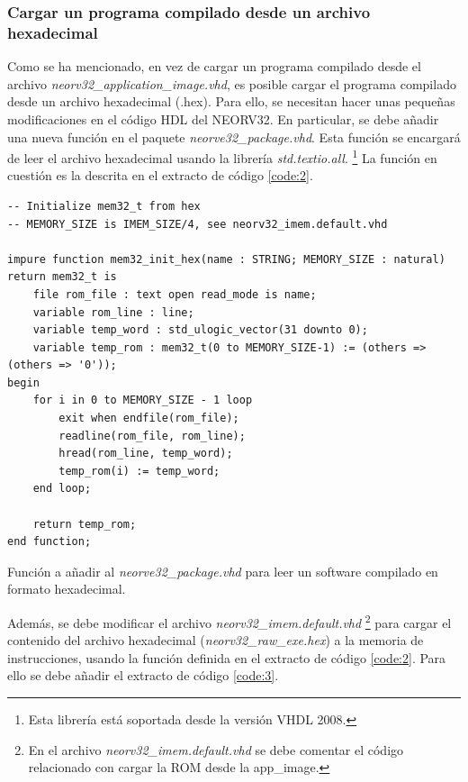 \subsubsection{Cargar un programa compilado desde un archivo hexadecimal}

Como se ha mencionado, en vez de cargar un programa compilado desde el archivo \textit{neorv32\_application\_image.vhd}, es posible cargar el programa compilado desde un archivo hexadecimal (.hex).
Para ello, se necesitan hacer unas pequeñas modificaciones en el código HDL del NEORV32.
En particular, se debe añadir una nueva función en el paquete \textit{neorve32\_package.vhd}.
Esta función se encargará de leer el archivo hexadecimal usando la librería \textit{std.textio.all}. \footnote{Esta librería está soportada desde la versión VHDL 2008.}
La función en cuestión es la descrita en el extracto de código \ref{code:2}.

\begin{code}
\begin{verbatim}
-- Initialize mem32_t from hex
-- MEMORY_SIZE is IMEM_SIZE/4, see neorv32_imem.default.vhd

impure function mem32_init_hex(name : STRING; MEMORY_SIZE : natural) return mem32_t is
    file rom_file : text open read_mode is name;
    variable rom_line : line;
    variable temp_word : std_ulogic_vector(31 downto 0);
    variable temp_rom : mem32_t(0 to MEMORY_SIZE-1) := (others => (others => '0'));
begin
    for i in 0 to MEMORY_SIZE - 1 loop
        exit when endfile(rom_file);
        readline(rom_file, rom_line);
        hread(rom_line, temp_word);
        temp_rom(i) := temp_word;
    end loop;

    return temp_rom;
end function;
\end{verbatim}
\caption{Función a añadir al \textit{neorve32\_package.vhd} para leer un software compilado en formato hexadecimal.}
\label{code:2}
\end{code}

Además, se debe modificar el archivo \textit{neorv32\_imem.default.vhd} \footnote{En el archivo \textit{neorv32\_imem.default.vhd} se debe comentar el código relacionado con cargar la ROM desde la app\_image.} para cargar el contenido del archivo hexadecimal (\textit{neorv32\_raw\_exe.hex}) a la memoria de instrucciones, usando la función definida en el extracto de código \ref{code:2}.
Para ello se debe añadir el extracto de código \ref{code:3}.

